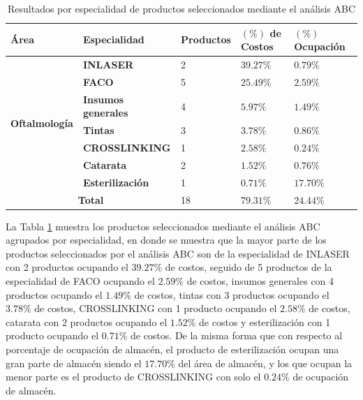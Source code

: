 \begin{table}[H]
    \caption{Resultados por especialidad de productos seleccionados mediante el análisis ABC}
    \begin{tabular}{p{2.5cm} p{3cm} p{2cm} p{3cm} p{3cm}}
        \hline
        \textbf{Área} & \textbf{Especialidad} & \textbf{Productos} & \textbf{$(\%)$ de Costos} & \textbf{$(\%)$ Ocupación} \\
        \hline
        \multirow{7}{*}{\textbf{Oftalmología}} & \textbf{INLASER} & 2 & $39.27\%$ & $0.79\%$ \\ \cline{2-5}
        & \textbf{FACO} & 5 & $25.49\%$ & $2.59\%$ \\ \cline{2-5}
        & \textbf{Insumos generales} & 4 & $5.97\%$ & $1.49\%$ \\ \cline{2-5}
        & \textbf{Tintas} & 3 & $3.78\%$ & $0.86\%$ \\ \cline{2-5} \cline{2-5}
        & \textbf{CROSSLINKING} & 1 & $2.58\%$ & $0.24\%$ \\ \cline{2-5}
        & \textbf{Catarata} & 2 & $1.52\%$ & $0.76\%$ \\ \cline{2-5}
        & \textbf{Esterilización} & 1 & $0.71\%$ & $17.70\%$ \\
        \hline
        \multicolumn{2}{c}{\textbf{Total}} & 18 & $79.31\%$ & $24.44\%$ 
    \end{tabular}
    \label{table:GrupoA_Especialidad}
\end{table}

La Tabla \ref{table:GrupoA_Especialidad} muestra los productos seleccionados mediante el análisis ABC agrupados por especialidad, en donde se muestra que la mayor parte de los productos seleccionados por el análisis ABC son de la especialidad de INLASER con 2 productos ocupando el $39.27\%$ de costos, seguido de 5 productos de la especialidad de FACO ocupando el $2.59\%$ de costos, insumos generales con 4 productos ocupando el $1.49\%$ de costos, tintas con 3 productos ocupando el $3.78\%$ de costos, CROSSLINKING con 1 producto ocupando el $2.58\%$ de costos, catarata con 2 productos ocupando el $1.52\%$ de costos y esterilización con 1 producto ocupando el $0.71\%$ de costos. De la misma forma que con respecto al porcentaje de ocupación de almacén, el producto de esterilización ocupan una gran parte de almacén siendo el $17.70\%$ del área de almacén, y los que ocupan la menor parte es el producto de CROSSLINKING con solo el $0.24\%$ de ocupación de almacén.

